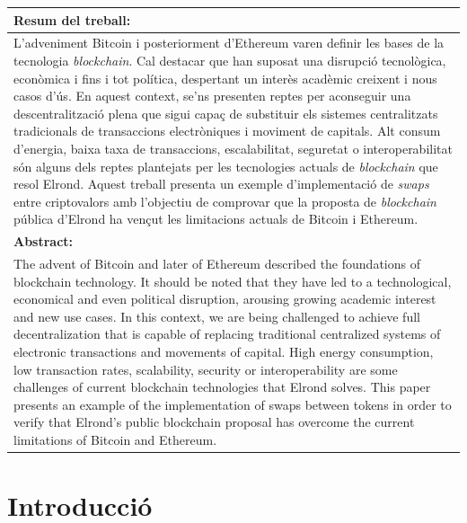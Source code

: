 \documentclass[11pt,a4paper]{article}
\begin{document}
\begin{tabularx}{\textwidth}{|X|}
\textbf{Resum del treball:}  \\ 
\hline 
\cellcolor{gray!25} L'adveniment Bitcoin i posteriorment d'Ethereum varen definir les bases de la tecnologia \textit{blockchain}. Cal destacar que han suposat una disrupció tecnològica, econòmica i fins i tot política, despertant un interès acadèmic creixent i nous casos d'ús. En aquest context, se'ns presenten reptes per aconseguir una descentralització plena que sigui capaç de substituir els sistemes centralitzats tradicionals de transaccions electròniques i moviment de capitals. Alt consum d'energia, baixa taxa de transaccions, escalabilitat, seguretat o interoperabilitat són alguns dels reptes plantejats per les tecnologies actuals de \textit{blockchain} que resol Elrond. Aquest treball presenta un exemple d'implementació de \textit{swaps} entre criptovalors amb l'objectiu de comprovar que la proposta de \textit{blockchain} pública d'Elrond ha vençut les limitacions actuals de Bitcoin i Ethereum. \\
\hline 
\textbf{Abstract:}  \\ 
\hline 
\cellcolor{gray!25} The advent of Bitcoin and later of Ethereum described the foundations of blockchain technology. It should be noted that they have led to a technological, economical and even political disruption, arousing growing academic interest and new use cases. In this context, we are being challenged to achieve full decentralization that is capable of replacing traditional centralized systems of electronic transactions and movements of capital. High energy consumption, low transaction rates, scalability, security or interoperability are some challenges of current blockchain technologies that Elrond solves. This paper presents an example of the implementation of swaps between tokens in order to verify that Elrond's public blockchain proposal has overcome the current limitations of Bitcoin and Ethereum. \\
\hline 
\end{tabularx} 
\newpage 


\tableofcontents
\newpage


\listoffigures
\newpage


\section{Introducció}
\end{document}
